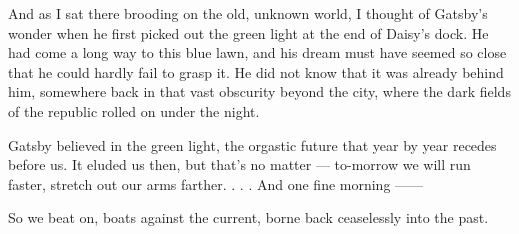 \documentclass{znotebook}
\begin{document}
And as I sat there brooding on the old, unknown world, I thought of Gatsby’s wonder when he first picked out the green light at the end of Daisy’s dock. He had come a long way to this blue lawn, and his dream must have seemed so close that he could hardly fail to grasp it. He did not know that it was already behind him, somewhere back in that vast obscurity beyond the city, where the dark fields of the republic rolled on under the night.

Gatsby believed in the green light, the orgastic future that year by year recedes before us. It eluded us then, but that’s no matter — to-morrow we will run faster, stretch out our arms farther. . . . And one fine morning ——

So we beat on, boats against the current, borne back ceaselessly into the past.
\end{document}
